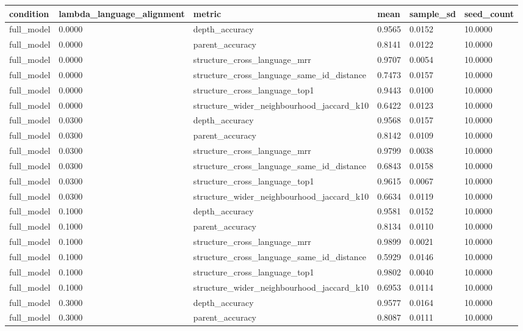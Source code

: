 \begin{tabular}{llllll}
 \hline
condition & lambda\_language\_alignment & metric & mean & sample\_sd & seed\_count \\
 \hline
full\_model & 0.0000 & depth\_accuracy & 0.9565 & 0.0152 & 10.0000 \\
full\_model & 0.0000 & parent\_accuracy & 0.8141 & 0.0122 & 10.0000 \\
full\_model & 0.0000 & structure\_cross\_language\_mrr & 0.9707 & 0.0054 & 10.0000 \\
full\_model & 0.0000 & structure\_cross\_language\_same\_id\_distance & 0.7473 & 0.0157 & 10.0000 \\
full\_model & 0.0000 & structure\_cross\_language\_top1 & 0.9443 & 0.0100 & 10.0000 \\
full\_model & 0.0000 & structure\_wider\_neighbourhood\_jaccard\_k10 & 0.6422 & 0.0123 & 10.0000 \\
full\_model & 0.0300 & depth\_accuracy & 0.9568 & 0.0157 & 10.0000 \\
full\_model & 0.0300 & parent\_accuracy & 0.8142 & 0.0109 & 10.0000 \\
full\_model & 0.0300 & structure\_cross\_language\_mrr & 0.9799 & 0.0038 & 10.0000 \\
full\_model & 0.0300 & structure\_cross\_language\_same\_id\_distance & 0.6843 & 0.0158 & 10.0000 \\
full\_model & 0.0300 & structure\_cross\_language\_top1 & 0.9615 & 0.0067 & 10.0000 \\
full\_model & 0.0300 & structure\_wider\_neighbourhood\_jaccard\_k10 & 0.6634 & 0.0119 & 10.0000 \\
full\_model & 0.1000 & depth\_accuracy & 0.9581 & 0.0152 & 10.0000 \\
full\_model & 0.1000 & parent\_accuracy & 0.8134 & 0.0110 & 10.0000 \\
full\_model & 0.1000 & structure\_cross\_language\_mrr & 0.9899 & 0.0021 & 10.0000 \\
full\_model & 0.1000 & structure\_cross\_language\_same\_id\_distance & 0.5929 & 0.0146 & 10.0000 \\
full\_model & 0.1000 & structure\_cross\_language\_top1 & 0.9802 & 0.0040 & 10.0000 \\
full\_model & 0.1000 & structure\_wider\_neighbourhood\_jaccard\_k10 & 0.6953 & 0.0114 & 10.0000 \\
full\_model & 0.3000 & depth\_accuracy & 0.9577 & 0.0164 & 10.0000 \\
full\_model & 0.3000 & parent\_accuracy & 0.8087 & 0.0111 & 10.0000 \\

\end{tabular}
